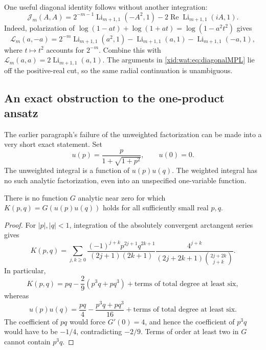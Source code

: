 One useful diagonal identity follows without another integration:
\begin{equation}\label{xid:wat:eq:diagonalMPL}
 \mathcal J_m(A,A)
 =2^{-m-1}\operatorname{Li}_{m+1,1}(-A^2,1)
   -2\operatorname{Re}\operatorname{Li}_{m+1,1}(iA,1).
\end{equation}
Indeed, polarization of
$\log(1-at)+\log(1+at)=\log(1-a^2t^2)$ gives
\[
 \mathcal L_m(a,-a)
 =2^{-m}\operatorname{Li}_{m+1,1}(a^2,1)
   -\operatorname{Li}_{m+1,1}(a,1)
   -\operatorname{Li}_{m+1,1}(-a,1),
\]
where $t\mapsto t^2$ accounts for $2^{-m}$. Combine this with
$\mathcal L_m(a,a)=2\operatorname{Li}_{m+1,1}(a,1)$.
The arguments in \eqref{xid:wat:eq:diagonalMPL} lie off the positive-real
cut, so the same radial continuation is unambiguous.

\subsection{An exact obstruction to the one-product ansatz}

The earlier paragraph's failure of the unweighted factorization can
be made into a very short exact statement. Set
\[
 u(p)=\frac{p}{1+\sqrt{1+p^2}},\qquad u(0)=0.
\]
The unweighted integral is a function of $u(p)u(q)$. The weighted
integral has no such analytic factorization, even into an unspecified
one-variable function.

\begin{proposition}\label{xid:wat:prop:nonfactor}
There is no function $G$ analytic near zero for which
$K(p,q)=G(u(p)u(q))$ holds for all sufficiently small real $p,q$.
\end{proposition}

\begin{proof}
For $|p|,|q|<1$, integration of the absolutely convergent arctangent
series gives
\begin{equation}\label{xid:wat:eq:doubleTaylor}
 K(p,q)=\sum_{j,k\geq0}
 \frac{(-1)^{j+k}p^{2j+1}q^{2k+1}}{(2j+1)(2k+1)}
 \frac{4^{j+k}}{(2j+2k+1)\binom{2j+2k}{j+k}}.
\end{equation}
In particular,
\[
 K(p,q)=pq-\frac29(p^3q+pq^3)
       +\text{terms of total degree at least six},
\]
whereas
\[
 u(p)u(q)=\frac{pq}{4}-\frac{p^3q+pq^3}{16}
       +\text{terms of total degree at least six}.
\]
The coefficient of $pq$ would force $G'(0)=4$, and hence the
coefficient of $p^3q$ would have to be $-1/4$, contradicting $-2/9$.
Terms of order at least two in $G$ cannot contain $p^3q$.
\end{proof}

